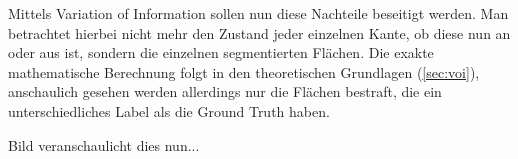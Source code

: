 Mittels Variation of Information sollen nun diese Nachteile beseitigt werden. Man betrachtet hierbei nicht mehr den Zustand jeder einzelnen Kante, ob diese nun an oder aus ist, sondern  die einzelnen segmentierten Flächen. Die exakte mathematische Berechnung folgt in den theoretischen Grundlagen (\ref{sec:voi}), anschaulich gesehen werden allerdings nur die Flächen bestraft, die ein unterschiedliches Label als die Ground Truth haben.

Bild veranschaulicht dies nun...

